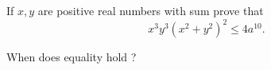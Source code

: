 If $ x,y$ are positive real numbers with sum  prove that
$$ x^3y^3(x^2+y^2)^2 \leq 4a^{10}.$$

When does equality hold ?
